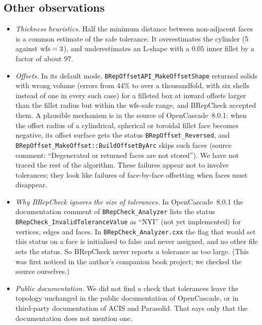 \subsection{Other observations}
\begin{itemize}
\item \emph{Thickness heuristics.} Half the minimum distance between non-adjacent faces is a common estimate of the
safe tolerance. It overestimates the cylinder (5 against $\operatorname{wfs}=3$), and underestimates an L-shape with a $0.05$
inner fillet by a factor of about $97$.
\item \emph{Offsets.} In its default mode, \texttt{BRepOffsetAPI\_MakeOffsetShape} returned solids with wrong
volume (errors from $44\%$ to over a thousandfold, with six shells instead of one in every such case) for a filleted box at
inward offsets larger than the fillet radius but within the $\operatorname{wfs}$-safe range, and BRepCheck accepted them. A plausible
mechanism is in the source of OpenCascade~8.0.1: when the offset radius of a cylindrical, spherical or toroidal fillet
face becomes negative, its offset
surface gets the status \texttt{BRepOffset\_Reversed}, and \texttt{BRepOffset\_MakeOffset::BuildOffsetByArc} skips
such faces (source comment: ``Degenerated or returned faces are not stored''). We have not traced the rest of the
algorithm. These failures appear not to involve tolerances; they look like failures of face-by-face offsetting when faces must
disappear.
\item \emph{Why BRepCheck ignores the size of tolerances.} In OpenCascade~8.0.1 the documentation comment of
\texttt{BRepCheck\_Analyzer} lists the status \texttt{BRepCheck\_InvalidToleranceValue} as ``NYI'' (not yet
implemented) for vertices, edges and faces. In \texttt{BRepCheck\_Analyzer.cxx} the flag that would set this status on a
face is initialised to false and never assigned, and no other file sets the status. So BRepCheck never reports a
tolerance as too large. (This was first noticed in the author's companion book project; we checked the source
ourselves.)
\item \emph{Public documentation.} We did not find a check that tolerances leave the topology unchanged in the
public documentation of OpenCascade, or in third-party documentation of ACIS and Parasolid. That says only that
the documentation does not mention one.
\end{itemize}
